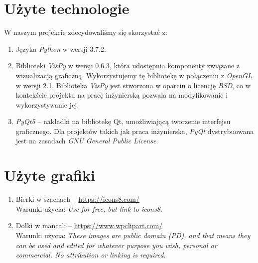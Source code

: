\documentclass{article}
\let\oldsection\section
\renewcommand\section{\clearpage\oldsection}
\newcommand{\modulename}[1]{\textit{#1}}
\begin{document}
\section{Użyte technologie}
W naszym projekcie zdecydowaliśmy się skorzystać z:
\begin{enumerate}
	\item Języka \modulename{Python} w wersji 3.7.2.
	\item Biblioteki \modulename{VisPy} w wersji 0.6.3, która udostępnia komponenty związane z wizualizacją graficzną. Wykorzystujemy tę bibliotekę w połączeniu z \modulename{OpenGL} w wersji 2.1. Biblioteka \modulename{VisPy} jest stworzona w oparciu o licencję \modulename{BSD}, co w kontekście projektu na pracę inżynierską pozwala na modyfikowanie i wykorzystywanie jej.
	\item \modulename{PyQt5} – nakładki na bibliotekę Qt, umożliwiającą tworzenie interfejsu graficznego. Dla projektów takich jak praca inżynierska, \modulename{PyQt} dystrybuowana jest na zasadach \modulename{GNU General Public License}.
\end{enumerate}


\section{Użyte grafiki}
\begin{enumerate}
	\item Bierki w szachach – \url{https://icons8.com/}\\
	Warunki użycia: \textit{Use for free,
	but link to icons8.}
	\item Dołki w mancali – \url{https://www.wpclipart.com/}\\
	Warunki użycia: \textit{These images are public domain (PD), and that means they can be used and edited for whatever purpose you wish, personal or commercial. No attribution or linking is required.}
\end{enumerate}
\end{document}
